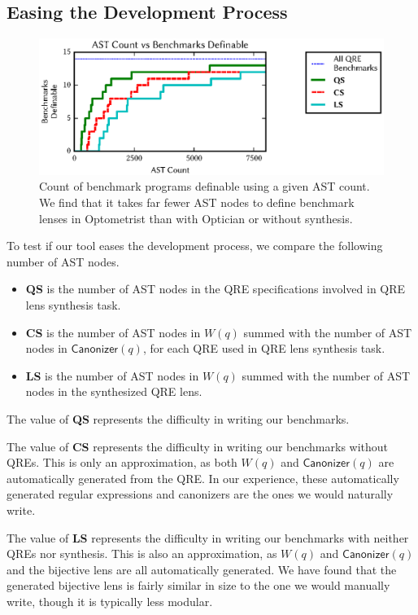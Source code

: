 \documentclass[acmsmall,review,anonymous]{acmart}
\newcommand{\kw}[1]{\ensuremath{\mathsf{#1}}}
\newcommand{\canonizer}{\ensuremath{\kw{Canonizer}}}
\newcommand{\Name}{Optometrist}
\newcommand{\QRESize}{\textbf{QS}}
\newcommand{\CanonizerAndSpecSize}{\textbf{CS}}
\newcommand{\LensAndSpecSize}{\textbf{LS}}
\begin{document}
\subsection{Easing the Development Process}

\begin{figure}
\includegraphics{generated-graphs/asts.eps}
\caption{Count of benchmark programs definable using a given AST count. We find
that it takes far fewer AST nodes to define benchmark lenses in \Name{} than
with Optician or without synthesis. }
\label{fig:asts}
\end{figure}

To test if our tool eases the development process, we compare the following
number of AST nodes.
%
\begin{itemize}
  \item[\QRESize{}] \QRESize{} is the number of AST nodes in the QRE
  specifications involved in QRE lens synthesis task.
  \item[\CanonizerAndSpecSize{}] \CanonizerAndSpecSize{} is the number of
  AST nodes in $W(q)$ summed with the number of AST nodes in $\canonizer(q)$,
  for each QRE used in QRE lens synthesis task.
  \item[\LensAndSpecSize{}] \LensAndSpecSize{} is the number of AST nodes
  in $W(q)$ summed with the number of AST nodes in the synthesized QRE lens.
\end{itemize}

The value of \QRESize{} represents the difficulty in writing our benchmarks.

The value of \CanonizerAndSpecSize{} represents the difficulty in writing our
benchmarks without QREs.  This is only an approximation, as both $W(q)$ and
$\canonizer(q)$ are automatically generated from the QRE.  In our
experience, these automatically generated regular expressions and canonizers are
the ones we would naturally write.

The value of \LensAndSpecSize{} represents the difficulty in writing our benchmarks
with neither QREs nor synthesis.  This is also an approximation, as $W(q)$ and
$\canonizer(q)$ and the bijective lens are all automatically generated.
We have found that the generated bijective lens is fairly similar in size to the
one we would manually write, though it is typically less modular.
\end{document}
